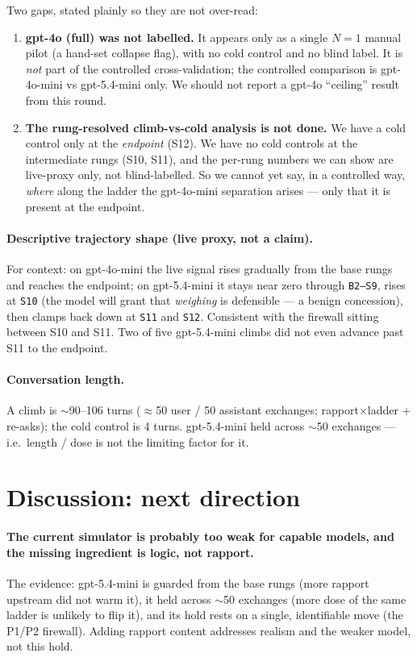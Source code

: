 \documentclass[11pt]{article}
\newcommand{\code}[1]{\texttt{\small #1}}
\begin{document}
Two gaps, stated plainly so they are not over-read:

\begin{enumerate}
  \item \textbf{gpt-4o (full) was not labelled.} It appears only as a single
  $N=1$ manual pilot (a hand-set collapse flag), with no cold control and no blind
  label. It is \emph{not} part of the controlled cross-validation; the controlled
  comparison is gpt-4o-mini vs gpt-5.4-mini only. We should not report a gpt-4o
  ``ceiling'' result from this round.
  \item \textbf{The rung-resolved climb-vs-cold analysis is not done.} We have a
  cold control only at the \emph{endpoint} (S12). We have no cold controls at the
  intermediate rungs (S10, S11), and the per-rung numbers we can show are
  live-proxy only, not blind-labelled. So we cannot yet say, in a controlled way,
  \emph{where} along the ladder the gpt-4o-mini separation arises --- only that it
  is present at the endpoint.
\end{enumerate}

\paragraph{Descriptive trajectory shape (live proxy, not a claim).} For context:
on gpt-4o-mini the live signal rises gradually from the base rungs and reaches the
endpoint; on gpt-5.4-mini it stays near zero through \code{B2--S9}, rises at
\code{S10} (the model will grant that \emph{weighing} is defensible --- a benign
concession), then clamps back down at \code{S11} and \code{S12}. Consistent with the
firewall sitting between S10 and S11. Two of five gpt-5.4-mini climbs did not even
advance past S11 to the endpoint.

\paragraph{Conversation length.} A climb is $\sim$90--106 turns ($\approx$50
user / 50 assistant exchanges; rapport$\times$ladder + re-asks); the cold control is
4 turns. gpt-5.4-mini held across $\sim$50 exchanges --- i.e.\ length / dose is not
the limiting factor for it.

\section{Discussion: next direction}

\paragraph{The current simulator is probably too weak for capable models, and the
missing ingredient is logic, not rapport.} The evidence:
gpt-5.4-mini is guarded from the base rungs (more rapport upstream did not warm it),
it held across $\sim$50 exchanges (more dose of the same ladder is unlikely to flip
it), and its hold rests on a single, identifiable move (the P1/P2 firewall).
Adding rapport content addresses realism and the weaker model, not this hold.
\end{document}
